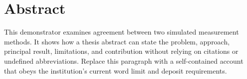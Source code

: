 \chapter*{Abstract}

This demonstrator examines agreement between two simulated measurement methods.
It shows how a thesis abstract can state the problem, approach, principal
result, limitations, and contribution without relying on citations or undefined
abbreviations. Replace this paragraph with a self-contained account that obeys
the institution's current word limit and deposit requirements.
